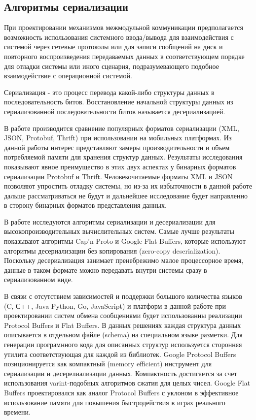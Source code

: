 \subsection{Алгоритмы сериализации}

При проектировании механизмов межмодульной коммуникации предполагается возможность использования системного ввода/вывода для взаимодействия с системой через сетевые протоколы или для записи сообщений на диск и повторного воспроизведения передаваемых данных в соответствующем порядке для отладки системы или иного сценария, подразумевающего подобное взаимодействие с операционной системой.

Сериализация - это процесс перевода какой-либо структуры данных в последовательность битов. Восстановление начальной структуры данных из сериализованной последовательности битов называется десериализацией.

В работе \cite{sumaray2012comparison} производится сравнение популярных форматов сериализации (XML, JSON, Protobuf, Thrift) при использовании на мобильных платформах. Из данной работы интерес представляют замеры производительности и объем потребляемой памяти для хранения структур данных. Результаты исследования показывают явное преимущество в этих двух аспектах у бинарных форматов сериализации Protobuf и Thrift. Человекочитаемые форматы XML и JSON позволяют упростить отладку системы, но из-за их избыточности в данной работе дальше рассматриваться не будут и дальнейшее исследование будет направленно в сторону бинарных форматов представления данных.

В работе \cite{zaluzhnyi2016serialization} исследуются алгоритмы сериализации и десериализации для высокопроизводительных вычислительных систем. Самые лучше результаты показывают алгоритмы Cap'n Proto и Google Flat Buffers, которые используют алгоритмы десериализации без копирования (zero-copy deserialization). Поскольку десериализация занимает пренебрежимо малое процессорное время, данные в таком формате можно передавать внутри системы сразу в сериализованном виде.

В связи с отсутствием зависимостей и поддержки большого количества языков (C, С++, Java Python, Go, JavaScript) и платформ  в данной работе при проектировании систем обмена сообщениями будет использованны реализации Protocol Buffers и Flat Buffers. В данных решениях каждая структура данных описывается в отдельном файле (schema) на специальном языке разметки. Для генерации програмнного кода для описанных структур используется сторонняя утилита соответствующая для каждой из библиотек. Google Protocol Buffers позиционируется как компактный (memory efficient) инструмент для сериализации и десерелиализации данных. Компактность достигается за счет использования varint-подобных алгоритмов сжатия для целых чисел. Google Flat Buffers проектировался как аналог Protocol Buffers с уклоном в эффективное использование памяти для повышения быстродействия в играх реального времени. 

